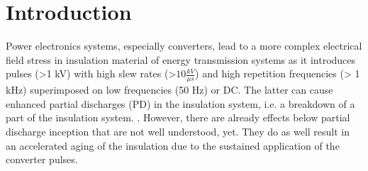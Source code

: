 
\chapter{Introduction}
Power electronics systems, especially converters, lead to a more complex electrical field stress in insulation material of energy transmission systems as it introduces pulses (>1 kV) with high slew rates (>$10 \frac{kV}{\mu s}$) and high repetition frequencies (> 1 kHz) superimposed on low frequencies (50 Hz) or DC. The latter can cause enhanced partial discharges (PD) in the insulation system, i.e. a breakdown of a part of the insulation system. \cite{TransformerEngineering}. However, there are already effects below partial discharge inception that are not well understood, yet. They do as well result in an accelerated aging of the insulation due to the sustained application of the converter pulses. 
\newline

